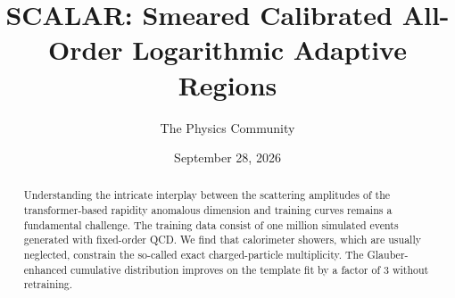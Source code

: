 \documentclass[11pt]{article}
\title{SCALAR: Smeared Calibrated All-Order Logarithmic Adaptive Regions}
\author{The Physics Community}
\date{September 28, 2026}
\begin{document}
\maketitle
\begin{abstract}
Understanding the intricate interplay between the scattering amplitudes
of the transformer-based rapidity anomalous dimension and training
curves remains a fundamental challenge. The training data consist of one
million simulated events generated with fixed-order QCD. We find that
calorimeter showers, which are usually neglected, constrain the
so-called exact charged-particle multiplicity. The Glauber-enhanced
cumulative distribution improves on the template fit by a factor of 3
without retraining.
\end{abstract}
\tableofcontents




\nocite{*}


\end{document}
